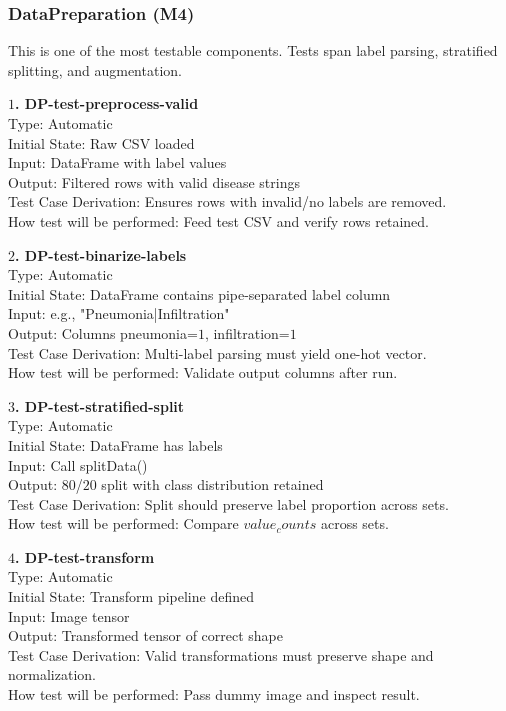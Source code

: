 \documentclass[12pt, titlepage]{article}
\begin{document}
\subsubsection{DataPreparation (M4)}
This is one of the most testable components. Tests span label parsing, stratified splitting, and augmentation.

\textbf{$1$. DP-test-preprocess-valid}\\
Type: Automatic\\
Initial State: Raw CSV loaded\\
Input: DataFrame with label values\\
Output: Filtered rows with valid disease strings\\
Test Case Derivation: Ensures rows with invalid/no labels are removed.\\
How test will be performed: Feed test CSV and verify rows retained.

\textbf{$2$. DP-test-binarize-labels}\\
Type: Automatic\\
Initial State: DataFrame contains pipe-separated label column\\
Input: e.g., "Pneumonia|Infiltration"\\
Output: Columns pneumonia=$1$, infiltration=$1$\\
Test Case Derivation: Multi-label parsing must yield one-hot vector.\\
How test will be performed: Validate output columns after run.

\textbf{$3$. DP-test-stratified-split}\\
Type: Automatic\\
Initial State: DataFrame has labels\\
Input: Call splitData()\\
Output: $80$/$20$ split with class distribution retained\\
Test Case Derivation: Split should preserve label proportion across sets.\\
How test will be performed: Compare $value_counts$ across sets.

\textbf{$4$. DP-test-transform}\\
Type: Automatic\\
Initial State: Transform pipeline defined\\
Input: Image tensor\\
Output: Transformed tensor of correct shape\\
Test Case Derivation: Valid transformations must preserve shape and normalization.\\
How test will be performed: Pass dummy image and inspect result.
\end{document}
